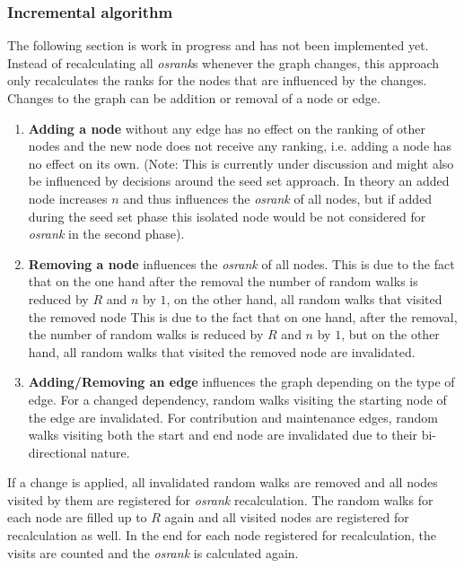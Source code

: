 \documentclass{article}
\begin{document}
\subsubsection{Incremental algorithm}
The following section is work in progress and has not been implemented yet.\\
Instead of recalculating all \textit{osrank}s whenever the graph changes,
this approach only recalculates the ranks for the nodes that are influenced by
the changes. Changes to the graph can be addition or removal of a node or edge.

\begin{enumerate}
\item  \textbf{Adding a node} without any edge has no effect on the ranking
       of other nodes and the new node does not receive any ranking, i.e. adding a node
       has no effect on its own.
       (Note: This is currently under discussion and might also be influenced
       by decisions around the seed set approach. In theory an added node increases
       $n$ and thus influences the \textit{osrank} of all nodes, but if added during the seed set
       phase this isolated node would be not considered for \textit{osrank} in the
       second phase).
\item \textbf{Removing a node} influences the \textit{osrank} of all nodes.
      This is due to the fact that on the one hand
      after the removal the number of random walks is reduced by $R$ and $n$ by
      $1$, on the other hand, all random walks that visited the removed node
This is due to the fact that on one hand, after the removal, the number of random walks is reduced by $R$ and $n$ by $1$, but on the other hand, all random walks that visited the removed node are invalidated.
\item \textbf{Adding/Removing an edge} influences the graph depending on the type
      of edge. For a changed dependency, random walks
      visiting the starting node of the edge are invalidated. For contribution
      and maintenance edges, random walks visiting both the start and end node
      are invalidated due to their bi-directional nature.
\end{enumerate}

If a change is applied, all invalidated random walks are removed and all nodes visited
by them are registered for \textit{osrank} recalculation. The random walks
for each node are filled up to $R$ again and all visited nodes are
registered for recalculation as well.
In the end for each node registered for recalculation, the visits are counted
and the \textit{osrank} is calculated again.
\end{document}
